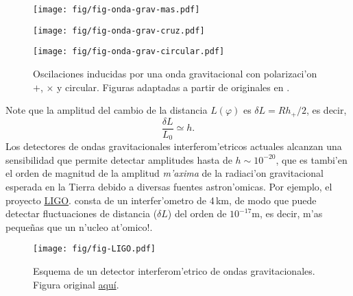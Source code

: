 \begin{center}
\begin{figure}[H]
\centerline{\texttt{[image: fig/fig-onda-grav-mas.pdf]}}
\centerline{\texttt{[image: fig/fig-onda-grav-cruz.pdf]}}
\centerline{\texttt{[image: fig/fig-onda-grav-circular.pdf]}}
\caption{Oscilaciones inducidas por una onda gravitacional con polarizaci'on $+$, $\times$ y circular. Figuras adaptadas a partir de originales en \cite{Carroll97}.}
\label{fig:og}
\end{figure}
\end{center}
Note que la amplitud del cambio de la distancia $L(\varphi)$ es $\delta L=Rh_+/2$, es decir,
\begin{equation}
\boxed{ \frac{\delta L}{L_0}\simeq h .}
\end{equation}
Los detectores de ondas gravitacionales interferom'etricos actuales alcanzan una sensibilidad que permite detectar amplitudes hasta de $h\sim 10^{-20}$, que es tambi'en el orden de magnitud de la amplitud \textit{m'axima} de la radiaci'on gravitacional esperada en la Tierra debido a diversas fuentes astron'omicas. Por ejemplo, el proyecto \href{http://www.ligo.caltech.edu/}{LIGO}. consta de un interfer'ometro de 4\,km, de modo que puede detectar fluctuaciones de distancia ($\delta L$) del orden de $10^{-17}\text{m}$, es decir, m'as peque\~nas que un n'ucleo at'omico!.

\begin{center}
\begin{figure}[H]
\centerline{\texttt{[image: fig/fig-LIGO.pdf]}}
\caption{Esquema de un detector interferom'etrico de ondas gravitacionales. Figura original \href{http://commons.wikimedia.org/wiki/File:Ligo.svg}{aqu\'i}.}
\label{fig:LIGO}
\end{figure}
\end{center}
